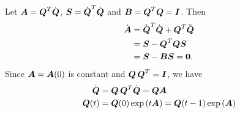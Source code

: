 \documentclass[11pt]{article}
\begin{document}
Let $\boldsymbol{A} = \boldsymbol{Q}^{T}\dot{\boldsymbol{Q}}$, $\boldsymbol{S} = \dot{\boldsymbol{Q}}^{T}\dot{\boldsymbol{Q}}$ and $\boldsymbol{B} = \boldsymbol{Q}^{T}\boldsymbol{Q}= \boldsymbol{I}$. Then 
\begin{align*}
\dot{\boldsymbol{A}} &= \dot{\boldsymbol{Q}}^{T}\dot{\boldsymbol{Q}}+  \boldsymbol{Q}^{T}\ddot{\boldsymbol{Q}}\\
&= \boldsymbol{S} - \boldsymbol{Q}^{T}\boldsymbol{Q}\boldsymbol{S} \\
&= \boldsymbol{S} - \boldsymbol{B}\boldsymbol{S} = \boldsymbol{0}.
\end{align*}
 Since $\boldsymbol{A}= \boldsymbol{A}(0)$ is constant and $\boldsymbol{Q\,Q}^{T}= \boldsymbol{I}$, we have
 \begin{align}
 \dot{\boldsymbol{Q}} &=\boldsymbol{Q\,Q}^{T}\dot{\boldsymbol{Q}} = \boldsymbol{Q}\boldsymbol{A} \nonumber\\
\boldsymbol{Q}(t) &= \boldsymbol{Q}(0)\exp\left(t\boldsymbol{A}\right) =\boldsymbol{Q}(t-1)\exp\left(\boldsymbol{A}\right) \label{eqn: geo_orthog_curve}
\end{align}
\end{document}

